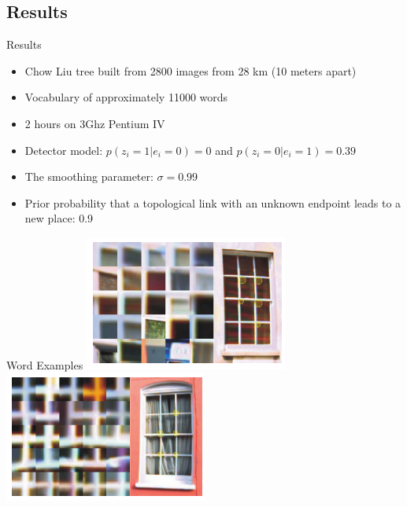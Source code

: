 \subsection{Results}
\begin{frame}{Results}
    \begin{itemize}
        \item Chow Liu tree built from 2800 images from 28 km (10 meters apart)
        \item Vocabulary of approximately 11000 words
        \item 2 hours on 3Ghz Pentium IV
        \item Detector model: $p(z_i=1|e_i=0)=0$ and $p(z_i=0|e_i=1)=0.39$
        \item The smoothing parameter: $\sigma=0.99$
        \item Prior probability that a topological link with an unknown endpoint leads to a new place: 0.9
    \end{itemize}
\end{frame}

\begin{frame}{Word Examples}
    \includegraphics[width=0.5\textwidth]{./media/word_top_left.png}
    \includegraphics[width=0.5\textwidth]{./media/word_bot_right.png}
\end{frame}

